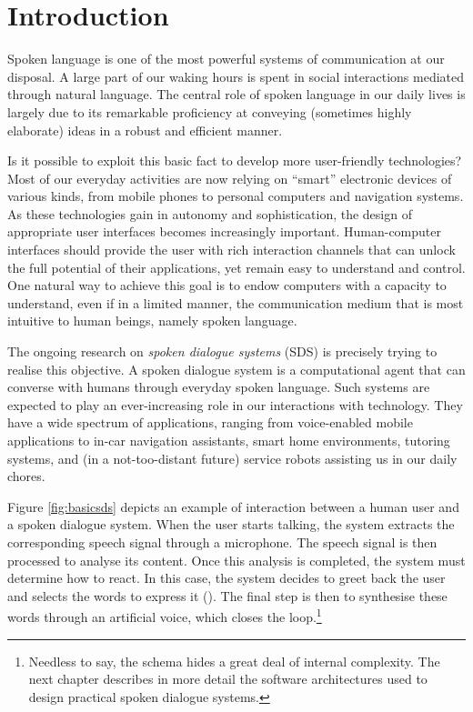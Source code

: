 
\chapter{Introduction}
\setcounter{page}{1}
\pagestyle{plain}

Spoken language is one of the most powerful systems of communication at our disposal. A large part of our waking hours is spent in social interactions mediated through natural language.  The central role of spoken language in our daily lives is largely due to its remarkable proficiency at conveying (sometimes highly elaborate) ideas in a robust and efficient manner. 

Is it possible to exploit this basic fact to develop more user-friendly technologies? Most of our everyday activities are now relying on ``smart'' electronic devices of various kinds, from mobile phones to personal computers and navigation systems. As these technologies gain in autonomy and sophistication, the design of appropriate user interfaces becomes increasingly important. Human-computer interfaces should provide the user with rich interaction channels that can unlock the full potential of their applications, yet remain easy to understand and control.  One natural way to achieve this goal is to endow computers with a capacity to understand, even if in a limited manner, the communication medium that is most intuitive to human beings, namely spoken language.  

The ongoing research on \textit{spoken dialogue systems} (SDS) is precisely trying to realise this objective. A spoken dialogue system is a computational agent that can converse with humans through everyday spoken language. Such systems are expected to play an ever-increasing role in our interactions with technology. They have a wide spectrum of applications, ranging from voice-enabled mobile applications to in-car navigation assistants, smart home environments, tutoring systems, and (in a not-too-distant future) service robots assisting us in our daily chores.

Figure \ref{fig:basicsds} depicts an example of interaction between a human user and a spoken dialogue system. When the user starts talking, the system extracts the corresponding speech signal through a microphone.  The speech signal is then processed to analyse its content.  Once this analysis is completed, the system must determine how to react.  In this case, the system decides to greet back the user and selects the words to express it (). The final step is then to synthesise these words through an artificial voice, which closes the loop.\footnote{ Needless to say, the schema hides a great deal of internal complexity.  The next chapter describes in more detail the software architectures used to design practical spoken dialogue systems.}

